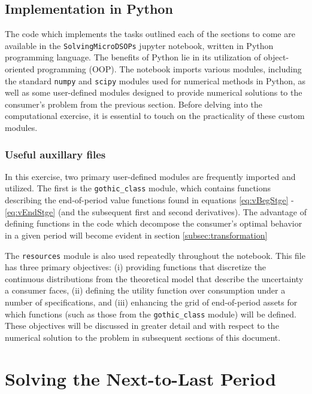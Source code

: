 \documentclass[titlepage, headings=optiontotocandhead]{\econtex}
\begin{document}
\unskip

\subsection{Implementation in Python}

The code which implements the tasks outlined each of the sections to come are available in the \texttt{SolvingMicroDSOPs} jupyter notebook, written in Python programming language. The benefits of Python lie in its utilization of object-oriented programming (OOP). The notebook imports various modules, including the standard \texttt{numpy} and \texttt{scipy} modules used for numerical methods in Python, as well as some user-defined modules designed to provide numerical solutions to the consumer's problem from the previous section. Before delving into the computational exercise, it is essential to touch on the practicality of these custom modules.

\subsubsection{Useful auxillary files}

In this exercise, two primary user-defined modules are frequently imported and utilized. The first is the \texttt{gothic\_class} module, which contains functions describing the end-of-period value functions found in equations \eqref{eq:vBegStge} - \eqref{eq:vEndStge} (and the subsequent first and second derivatives). The advantage of defining functions in the code which decompose the consumer's optimal behavior in a given period will become evident in section \ref{subsec:transformation}  

The \texttt{resources} module is also used repeatedly throughout the notebook. This file has three primary objectives: (i) providing functions that discretize the continuous distributions from the theoretical model that describe the uncertainty a consumer faces, (ii) defining the utility function over consumption under a number of specifications, and (iii) enhancing the grid of end-of-period assets for which functions (such as those from the \texttt{gothic\_class} module) will be defined. These objectives will be discussed in greater detail and with respect to the numerical solution to the problem in subsequent sections of this document.

\hypertarget{Solving-the-Next-To-Last-Period}{}\section{Solving the Next-to-Last Period}\label{sec:NextToLast}
\end{document}
